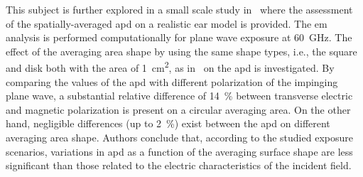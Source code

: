 This subject is further explored in a small scale study in~\cite{Kapetanovic2022Assessment} where the assessment of the spatially-averaged \gls{apd} on a realistic ear model is provided.
The \gls{em} analysis is performed computationally for plane wave exposure at \SI{60}{\GHz}.
The effect of the averaging area shape by using the same shape types, i.e., the square and disk both with the area of \SI{1}{\cm\squared}, as in~\cite{Morimoto2022Assessment} on the \gls{apd} is investigated.
By comparing the values of the \gls{apd} with different polarization of the impinging plane wave, a substantial relative difference of \SI{14}{\percent} between transverse electric and magnetic polarization is present on a circular averaging area.
On the other hand, negligible differences (up to \SI{2}{\percent}) exist between the \gls{apd} on different averaging area shape.
Authors conclude that, according to the studied exposure scenarios, variations in \gls{apd} as a function of the averaging surface shape are less significant than those related to the electric characteristics of the incident field.